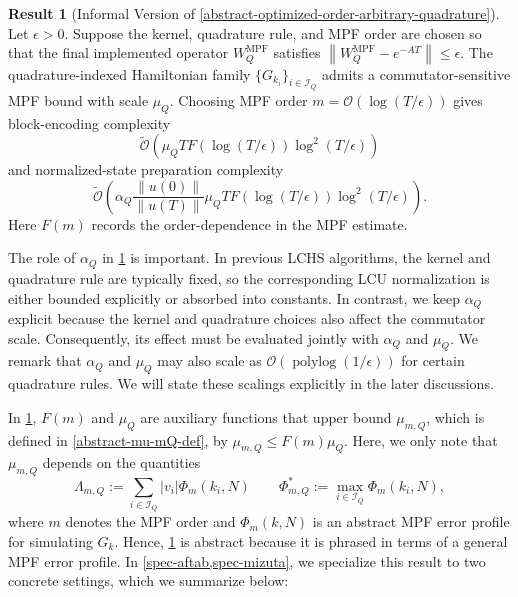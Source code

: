 \documentclass[10pt,reqno]{article}
\numberwithin{equation}{section}
\theoremstyle{plain}
\theoremstyle{definition}
\newtheorem{result}[thm]{Result}
\begin{document}
\begin{result}[Informal Version of \cref{abstract-optimized-order-arbitrary-quadrature}]  \label{informal-result-1} Let $\epsilon > 0$. Suppose the kernel, quadrature rule, and MPF order are chosen so that the final implemented operator \(W_Q^{\mathrm{MPF}}\) satisfies $\left\|W_Q^{\mathrm{MPF}}-e^{-AT}\right\|\leq \epsilon$. The quadrature-indexed Hamiltonian family \(\{G_{k_i}\}_{i\in \mathcal I_Q}\) admits a commutator-sensitive MPF bound with scale \(\mu_Q\). Choosing MPF order $m=\mathcal O \left(\log(T/\epsilon)\right)$ gives block-encoding complexity
\begin{equation}
\widetilde{\mathcal O}\left( \mu_Q T F \left(\log(T/\epsilon)\right) \log^2(T/\epsilon) \right)
\end{equation}
and normalized-state preparation complexity
\begin{equation}
\widetilde{\mathcal{O}} \left( \alpha_Q \frac{\|u(0)\|}{\|u(T)\|} \mu_Q T F \left(\log(T/\epsilon)\right) \log^2(T/\epsilon) \right).
\end{equation}
Here \(F(m)\) records the order-dependence in the MPF estimate. 
\end{result}

The role of \(\alpha_Q\) in \cref{informal-result-1} is important. In previous LCHS algorithms, the kernel and quadrature rule are typically fixed, so the corresponding LCU normalization is either bounded explicitly or absorbed into constants. In contrast, we keep \(\alpha_Q\) explicit because the kernel and quadrature choices also affect the commutator scale. Consequently, its effect must be evaluated jointly with \(\alpha_Q\) and \(\mu_Q\). We remark that \(\alpha_Q\) and \(\mu_Q\) may also scale as \(\mathcal{O}(\operatorname{polylog}(1/\epsilon))\) for certain quadrature rules. We will state these scalings explicitly in the later discussions.

In \cref{informal-result-1}, \(F(m)\) and \(\mu_Q\) are auxiliary functions that upper bound \(\mu_{m,Q}\), which is defined in \cref{abstract-mu-mQ-def}, by \(\mu_{m,Q} \leq F(m) \mu_Q\). Here, we only note that \(\mu_{m,Q}\) depends on the quantities
\begin{equation} 
\Lambda_{m,Q} := \sum_{i\in\mathcal I_Q}|v_i|\Phi_m(k_i,N) \qquad \Phi_{m,Q}^{\ast} := \max_{i\in\mathcal I_Q}\Phi_m(k_i,N),
\end{equation} 
where \(m\) denotes the MPF order and \(\Phi_m(k,N)\) is an abstract MPF error profile for simulating \(G_k\).  Hence, \cref{informal-result-1} is abstract because it is phrased in terms of a general MPF error profile. In \cref{spec-aftab,spec-mizuta}, we specialize this result to two concrete settings, which we summarize below:
\end{document}
